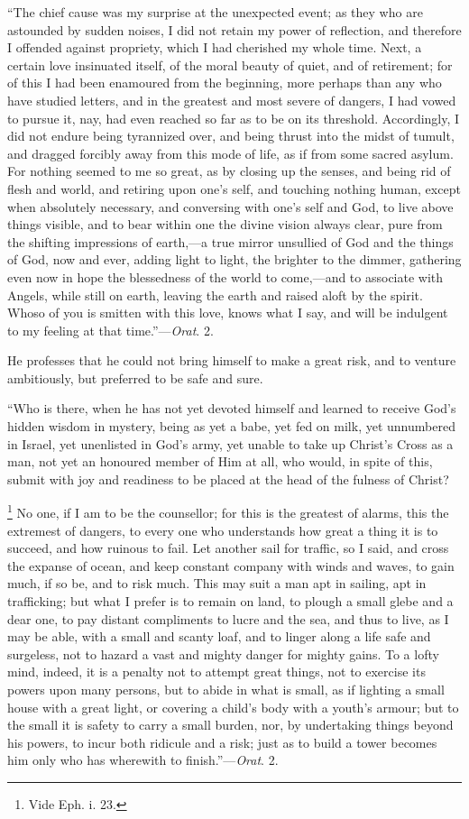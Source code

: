 ``The chief cause was my surprise at the unexpected event; as
they who are astounded by sudden noises, I did not retain my power of
reflection, and therefore I offended against propriety, which I had
cherished my whole time. Next, a certain love insinuated itself, of
the moral beauty of quiet, and of retirement; for of this I had been
enamoured from the beginning, more perhaps than any who have studied
letters, and in the greatest and most severe of dangers, I had vowed
to pursue it, nay, had even reached so far as to be on its threshold.
Accordingly, I did not endure being tyrannized over, and being thrust
into the midst of tumult, and dragged forcibly away from this mode of
life, as if from some sacred asylum. For nothing seemed to me so
great, as by closing up the senses, and being rid of flesh and world,
and retiring upon one's self, and touching nothing human, except when
absolutely necessary, and conversing with one's self and God, to live
above things visible, and to bear within one the divine vision always
clear, pure from the shifting impressions of earth,—a true mirror
unsullied of God and the things of God, now and ever, adding light to
light, the brighter to the dimmer, gathering even now in hope the
blessedness of the world to come,—and to associate with Angels,
while still on earth, leaving the earth and raised aloft by the
spirit. Whoso of you is smitten with this love, knows what I say, and
will be indulgent to my feeling at that time.''—\emph{Orat}. 2.

He professes that he could not bring himself to make a great risk,
and to venture ambitiously, but preferred to be safe and sure.

``Who is there, when he has not yet devoted himself and learned
to receive God's hidden wisdom in mystery, being as yet a babe, yet
fed on milk, yet unnumbered in Israel, yet unenlisted in God's
army, yet unable to take up Christ's Cross as a
man, not yet an honoured member of Him at all, who would, in spite of
this, submit with joy and readiness to be placed at the head of the
fulness of Christ?

\footnote{Vide Eph. i.
23.} No
one, if I am to be the counsellor; for this is the greatest of alarms,
this the extremest of dangers, to every one who understands how great
a thing it is to succeed, and how ruinous to fail. Let another sail
for traffic, so I said, and cross the expanse of ocean, and keep
constant company with winds and waves, to gain much, if so be, and to
risk much. This may suit a man apt in sailing, apt in trafficking; but
what I prefer is to remain on land, to plough a small glebe and a dear
one, to pay distant compliments to lucre and the sea, and thus to
live, as I may be able, with a small and scanty loaf, and to linger
along a life safe and surgeless, not to hazard a vast and mighty
danger for mighty gains. To a lofty mind, indeed, it is a penalty not
to attempt great things, not to exercise its powers upon many persons,
but to abide in what is small, as if lighting a small house with a
great light, or covering a child's body with a youth's armour; but to
the small it is safety to carry a small burden, nor, by undertaking
things beyond his powers, to incur both ridicule and a risk; just as
to build a tower becomes him only who has wherewith to finish.''—\emph{Orat}.
2.

